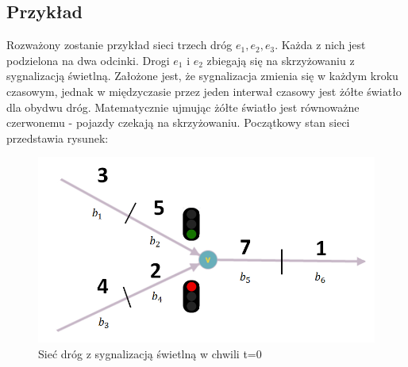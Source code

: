 \documentclass[12pt]{book}
\theoremstyle{plain}
\begin{document}
\subsection{Przykład}
Rozważony zostanie przykład sieci trzech dróg $e_1,e_2,e_3$. Każda z nich jest podzielona na dwa odcinki. Drogi $e_1$ i $e_2$ zbiegają się na skrzyżowaniu z sygnalizacją świetlną. Założone jest, że sygnalizacja zmienia się w każdym kroku czasowym, jednak w międzyczasie przez jeden interwał czasowy jest żółte światło dla obydwu dróg. Matematycznie ujmując żółte światło jest równoważne czerwonemu - pojazdy czekają na skrzyżowaniu. Początkowy stan sieci przedstawia rysunek:
\begin{figure}[H]
	\centering
	\includegraphics[width=14cm]{3_drogi_sygnalizacja}
	\caption{Sieć dróg z sygnalizacją świetlną w chwili t=0}
	\label{fig:3_drogi_sygnalizacja}
\end{figure}
\end{document}
